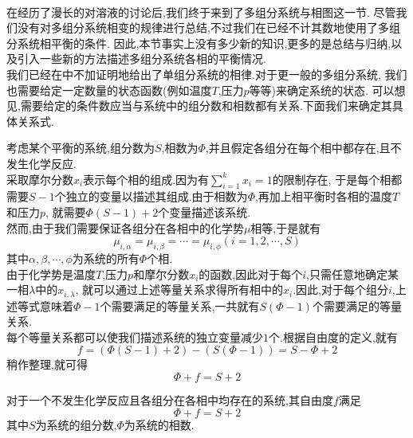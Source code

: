 \documentclass{ctexart}
\begin{document}
\pagestyle{plain}
\noindent{}\vspace{15pt}\\
\indent 在经历了漫长的对溶液的讨论后,我们终于来到了多组分系统与相图这一节.%
尽管我们没有对多组分系统相变的规律进行总结,不过我们在已经不计其数地使用了多组分系统相平衡的条件.%
因此,本节事实上没有多少新的知识,更多的是总结与归纳,以及引入一些新的方法描述多组分系统各相的平衡情况.\vspace{12pt}\\
\indent 我们已经在中不加证明地给出了单组分系统的相律.对于更一般的多组分系统,%
我们也需要给定一定数量的状态函数(例如温度$T$,压力$p$等等)来确定系统的状态.%
可以想见,需要给定的条件数应当与系统中的组分数和相数都有关系.下面我们来确定其具体关系式.
\begin{derivation}
    考虑某个平衡的系统,组分数为$S$,相数为$\varPhi$,并且假定各组分在每个相中都存在,且不发生化学反应.\\
    采取摩尔分数$x_i$表示每个相的组成.因为有$\displaystyle\sum_{i=1}^{k}x_i=1$的限制存在,%
    于是每个相都需要$S-1$个独立的变量以描述其组成.由于相数为$\varPhi$,再加上相平衡时各相的温度$T$和压力$p$,%
    就需要$\varPhi(S-1)+2$个变量描述该系统.\\
    然而,由于我们需要保证各组分在各相中的化学势$\mu$相等,于是就有
    \[\mu_{i,\alpha}=\mu_{i,\beta}=\cdots=\mu_{i,\phi}(i=1,2,\cdots,S)\]
    其中$\alpha,\beta,\cdots,\phi$为系统的所有$\varPhi$个相.\\
    由于化学势是温度$T$,压力$p$和摩尔分数$x_i$的函数,因此对于每个$i$,只需任意地确定某一相$\lambda$中的$x_{i,\lambda}$,%
    就可以通过上述等量关系求得所有相中的$x_i$.因此,对于每个组分$i$,上述等式意味着$\varPhi-1$个需要满足的等量关系,一共就有$S(\varPhi-1)$个需要满足的等量关系.\\
    每个等量关系都可以使我们描述系统的独立变量减少$1$个.根据自由度的定义,就有
    \[f=\left(\varPhi(S-1)+2\right)-\left(S(\varPhi-1)\right)=S-\varPhi+2\]
    稍作整理,就可得
    \[\varPhi+f=S+2\]

\end{derivation}
\begin{theorem}[4D.1.1 多组分系统的相律]
    对于一个不发生化学反应且各组分在各相中均存在的系统,其自由度$f$满足
    \[\varPhi+f=S+2\]
    其中$S$为系统的组分数,$\varPhi$为系统的相数.
\end{theorem}
\end{document}
